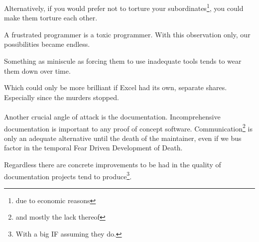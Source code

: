 \documentclass{book}
\begin{document}
    Alternatively,
    if you would prefer not to torture your subordinates\footnote{due to economic reasons},
    you could make them torture each other.

    A frustrated programmer is a toxic programmer.
    With this observation only,
    our possibilities became endless.

    Something as miniscule as forcing them to use inadequate tools
    tends to wear them down over time.

    Which could only be more brilliant if Excel had its own, separate shares.
    Especially since the murders stopped.
    \\

    \\

    Another crucial angle of attack is the documentation.
    Incomprehensive documentation is important %
    to any proof of concept software.          %
    Communication\footnote{and mostly the lack thereof}
    is only an adequate alternative
    until the death of the maintainer,
    even if we bus factor in the temporal Fear Driven Development of Death.
    
    Regardless there are concrete improvements to be had
    in the quality of documentation projects tend to produce\footnote{
        With a big IF assuming they do.
    }.
\end{document}
